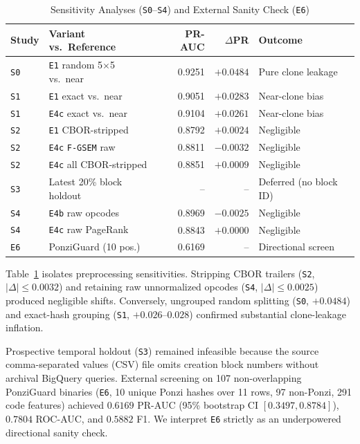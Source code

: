 \documentclass[conference]{IEEEtran}
\begin{document}
\begin{table}[t]
\centering
\caption{Sensitivity Analyses (\texttt{S0}--\texttt{S4}) and External Sanity Check (\texttt{E6})}
\label{tab:sensitivity}
\scriptsize
\setlength{\tabcolsep}{2.5pt}
\begin{tabular}{@{}llrrl@{}}
\toprule
Study & Variant vs.\ Reference & PR-AUC & $\Delta$PR & Outcome \\
\midrule
\texttt{S0} & \texttt{E1} random 5$\times$5 vs.\ near & 0.9251 & $+0.0484$ & Pure clone leakage \\
\texttt{S1} & \texttt{E1} exact vs.\ near & 0.9051 & $+0.0283$ & Near-clone bias \\
\texttt{S1} & \texttt{E4c} exact vs.\ near & 0.9104 & $+0.0261$ & Near-clone bias \\
\texttt{S2} & \texttt{E1} CBOR-stripped & 0.8792 & $+0.0024$ & Negligible \\
\texttt{S2} & \texttt{E4c} \texttt{F-GSEM} raw & 0.8811 & $-0.0032$ & Negligible \\
\texttt{S2} & \texttt{E4c} all CBOR-stripped & 0.8851 & $+0.0009$ & Negligible \\
\texttt{S3} & Latest 20\% block holdout & -- & -- & Deferred (no block ID) \\
\texttt{S4} & \texttt{E4b} raw opcodes & 0.8969 & $-0.0025$ & Negligible \\
\texttt{S4} & \texttt{E4c} raw PageRank & 0.8843 & $+0.0000$ & Negligible \\
\midrule
\texttt{E6} & PonziGuard (10 pos.) & 0.6169 & -- & Directional screen \\
\bottomrule
\end{tabular}
\end{table}

Table~\ref{tab:sensitivity} isolates preprocessing sensitivities. Stripping CBOR trailers (\texttt{S2}, $|\Delta| \le 0.0032$) and retaining raw unnormalized opcodes (\texttt{S4}, $|\Delta| \le 0.0025$) produced negligible shifts. Conversely, ungrouped random splitting (\texttt{S0}, $+0.0484$) and exact-hash grouping (\texttt{S1}, $+0.026$--$0.028$) confirmed substantial clone-leakage inflation.

Prospective temporal holdout (\texttt{S3}) remained infeasible because the source comma-separated values (CSV) file omits creation block numbers without archival BigQuery queries. External screening on 107 non-overlapping PonziGuard binaries (\texttt{E6}, 10 unique Ponzi hashes over 11 rows, 97 non-Ponzi, 291 code features) achieved $0.6169$ PR-AUC (95\% bootstrap CI $[0.3497, 0.8784]$), $0.7804$ ROC-AUC, and $0.5882$ F1\@. We interpret \texttt{E6} strictly as an underpowered directional sanity check.
\end{document}
